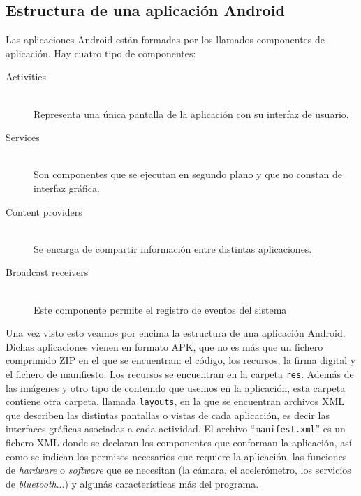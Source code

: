 \documentclass[a4paper,openright, 12pt]{book}
\begin{document}
\subsection*{Estructura de una aplicación Android}
Las aplicaciones Android están formadas por los llamados componentes de aplicación. Hay cuatro tipo de componentes:
\begin{description}
  \item[Activities] \hfill \\
  Representa una única pantalla de la aplicación con su interfaz de usuario.
  \item[Services] \hfill \\
  Son componentes que se ejecutan en segundo plano y que no constan de interfaz gráfica.
  \item[Content providers] \hfill \\
  Se encarga de compartir información entre distintas aplicaciones.
  \item[Broadcast receivers] \hfill \\
  Este componente permite el registro de eventos del sistema
\end{description}
Una vez visto esto veamos por encima la estructura de una aplicación Android.
Dichas aplicaciones vienen en formato APK, que no es más que un fichero comprimido ZIP en el que se encuentran: el código, los recursos, la firma digital y el fichero de manifiesto.
\newline
Los recursos se encuentran en la carpeta \lstinline|res|. Además de las imágenes y otro tipo de contenido que usemos en la aplicación, esta carpeta contiene otra carpeta, llamada \lstinline|layouts|, en la que se encuentran archivos XML que describen las distintas pantallas o vistas de cada aplicación, es decir las interfaces gráficas asociadas a cada actividad.
\newline
El archivo ``\lstinline|manifest.xml|'' es un fichero XML donde se declaran los componentes que conforman la aplicación, así como se indican los permisos necesarios que requiere la aplicación, las funciones de \textit{hardware} o \textit{software} que se necesitan (la cámara, el acelerómetro, los servicios de \textit{bluetooth}...) y algunás características más del programa.
\end{document}
